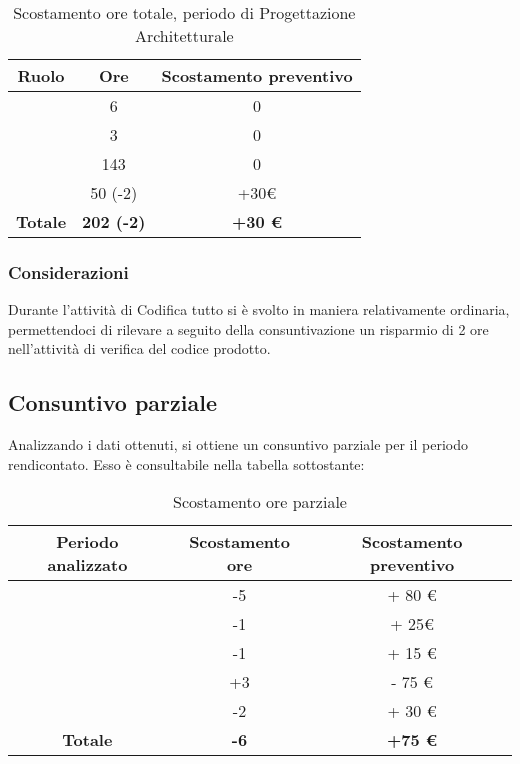 \begin{table}[H]
	\begin{center}
		\begin{tabular}{|c|c|c|}
			\hline
			\textbf{Ruolo}	& \textbf{Ore}	& \textbf{Scostamento preventivo} \\
			\hline
			\Res	&	6	&	0	\\
			\hline
			\Amm	&	3	&	0	\\
			\hline
			\Progr   &	143  &	0	\\
			\hline
			\Ver	&	50 (-2)	&	+30€ \\
			\hline
			\textbf{Totale} & \textbf{202 (-2)} & \textbf{+30 €}\\
			\hline
		\end{tabular}
	\end{center}
	\caption{Scostamento ore totale, periodo di Progettazione Architetturale}
\end{table}

\subsubsection{Considerazioni}
Durante l'attività di Codifica tutto si è svolto in maniera relativamente ordinaria, permettendoci di rilevare a seguito della consuntivazione un risparmio di 2 ore nell'attività di verifica del codice prodotto. 

\subsection{Consuntivo parziale}

Analizzando i dati ottenuti, si ottiene un consuntivo parziale per il periodo rendicontato. Esso è consultabile nella tabella sottostante:

\begin{table}[H]
	\begin{center}
		\begin{tabular}{|c|c|c|}
			\hline
			\textbf{Periodo analizzato}	& \textbf{Scostamento ore}	& \textbf{Scostamento preventivo} \\
			\hline
			\AdR	&	-5	&	+ 80 €	\\
			\hline
			\ARD	&	-1	&	+ 25€	\\
			\hline
			\PA   &		-1  &	+ 15 €	\\
			\hline
			\PD   &	+3  &	- 75 €	\\
			\hline
			\CO   &		-2  &	+ 30 €	\\
			\hline
			\textbf{Totale} & \textbf{-6} & \textbf{+75 €} \\
			\hline
		\end{tabular}
	\end{center}
	\caption{Scostamento ore parziale}
\end{table}

